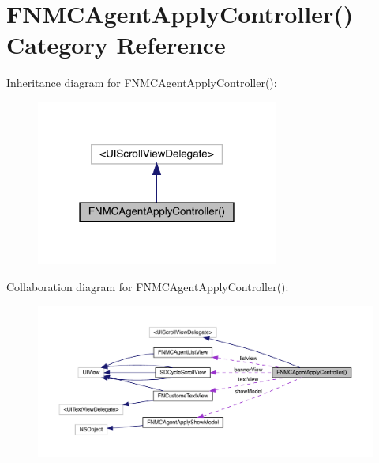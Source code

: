 \hypertarget{category_f_n_m_c_agent_apply_controller_07_08}{}\section{F\+N\+M\+C\+Agent\+Apply\+Controller() Category Reference}
\label{category_f_n_m_c_agent_apply_controller_07_08}


Inheritance diagram for F\+N\+M\+C\+Agent\+Apply\+Controller()\+:\nopagebreak
\begin{figure}[H]
\begin{center}
\leavevmode
\includegraphics[width=226pt]{category_f_n_m_c_agent_apply_controller_07_08__inherit__graph}
\end{center}
\end{figure}


Collaboration diagram for F\+N\+M\+C\+Agent\+Apply\+Controller()\+:\nopagebreak
\begin{figure}[H]
\begin{center}
\leavevmode
\includegraphics[width=350pt]{category_f_n_m_c_agent_apply_controller_07_08__coll__graph}
\end{center}
\end{figure}
